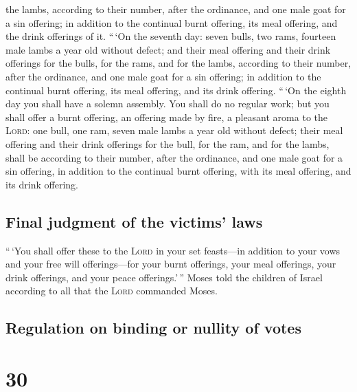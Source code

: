 the lambs, according to their number, after the ordinance,
 and one male goat for a sin offering; in addition to the
continual burnt offering, its meal offering, and the drink offerings of
it.  ``\,`On the seventh day: seven bulls, two rams,
fourteen male lambs a year old without defect;  and their
meal offering and their drink offerings for the bulls, for the rams, and
for the lambs, according to their number, after the ordinance,
 and one male goat for a sin offering; in addition to the
continual burnt offering, its meal offering, and its drink offering.
 ``\,`On the eighth day you shall have a solemn assembly.
You shall do no regular work;  but you shall offer a
burnt offering, an offering made by fire, a pleasant aroma to the
\textsc{Lord}: one bull, one ram, seven male lambs a year old without
defect;  their meal offering and their drink offerings
for the bull, for the ram, and for the lambs, shall be according to
their number, after the ordinance,  and one male goat for
a sin offering, in addition to the continual burnt offering, with its
meal offering, and its drink offering.

\hypertarget{final-judgment-of-the-victims-laws}{%
\subsection{Final judgment of the victims'
laws}\label{final-judgment-of-the-victims-laws}}

 ``\,`You shall offer these to the \textsc{Lord} in your
set feasts---in addition to your vows and your free will offerings---for
your burnt offerings, your meal offerings, your drink offerings, and
your peace offerings.'\,''  Moses told the children of
Israel according to all that the \textsc{Lord} commanded Moses.

\hypertarget{regulation-on-binding-or-nullity-of-votes}{%
\subsection{Regulation on binding or nullity of
votes}\label{regulation-on-binding-or-nullity-of-votes}}

\hypertarget{section-29}{%
\section{30}\label{section-29}}

